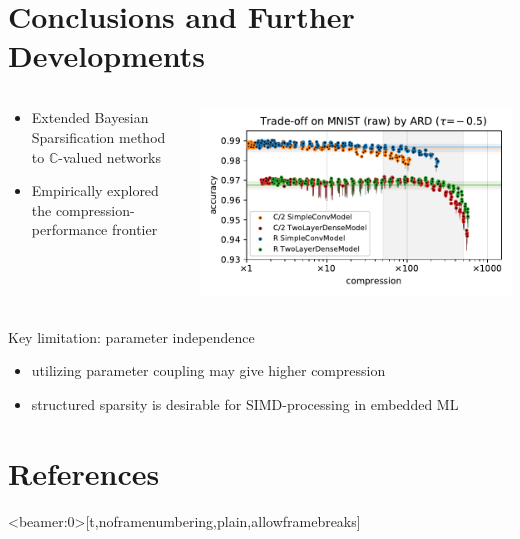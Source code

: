 \documentclass{beamer}
\newcommand{\cplx}{\mathbb{C}}
\begin{document}

\section{Conclusions and Further Developments} %
\label{sec:conclusions_and_further_developments}

\begin{frame}[c]{\insertsection}
  \begin{columns}[T]
    \begin{column}{0.38\textwidth}
      \begin{itemize}
        \item Extended Bayesian Sparsification method to $\cplx$-valued networks
        \item Empirically explored the compression-performance frontier
      \end{itemize}
    \end{column}
    \begin{column}{0.58\textwidth}
      \includegraphics[scale=0.35,clip]{figure__mnist-like__trade-off/appendix__cmp__ARD__mnist__raw__-0.5.pdf}
    \end{column}
  \end{columns}

  \bigskip
  Key limitation: parameter independence %
  \begin{itemize}
    \item utilizing parameter coupling may give higher compression
    \item structured sparsity is desirable for SIMD-processing in embedded ML
  \end{itemize}

\end{frame}


\section{References} %
\label{sec:references}

\begin{frame}<beamer:0>[t,noframenumbering,plain,allowframebreaks]{\insertsection}
  \tiny
  
  
\end{frame}

\end{document}
